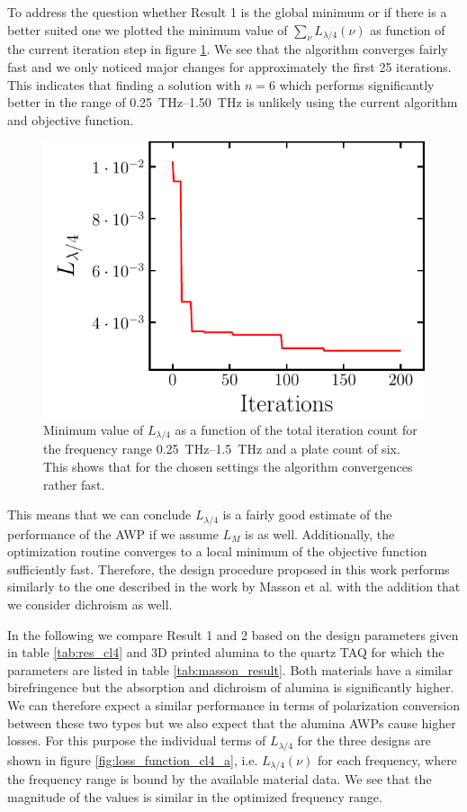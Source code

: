 To address the question whether Result 1 is the global minimum or if there is a better suited one we plotted the minimum value of $\sum_{\nu}L_{\lambda/4}(\nu)$ as function of the current iteration step in figure  \ref{fig:cl4_convergence}. We see that the algorithm converges fairly fast and we only noticed major changes for approximately the first 25 iterations. This indicates that finding a solution with $n=6$ which performs significantly better in the range of \SIrange{0.25}{1.50}{\tera \hertz} is unlikely using the current algorithm and objective function.

\begin{figure}[H]
    \centering
    \includegraphics[scale=0.7]{images/results/plots/ceramic/convergence.pdf}
    \caption{Minimum value of $L_{\lambda/4}$ as a function of the total iteration count for the frequency range \SIrange{0.25}{1.5}{\tera \hertz} and a plate count of six. This shows that for the chosen settings the algorithm convergences rather fast.}
    \label{fig:cl4_convergence}
\end{figure}

This means that we can conclude $L_{\lambda/4}$ is a fairly good estimate of the performance of the AWP if we assume $L_{M}$ is as well. Additionally, the optimization routine converges to a local minimum of the objective function sufficiently fast. Therefore, the design procedure proposed in this work performs similarly to the one described in the work by Masson et al. with the addition that we consider dichroism as well. 

In the following we compare Result 1 and 2 based on the design parameters given in table \ref{tab:res_cl4} and 3D printed alumina to the quartz TAQ for which the parameters are listed in table \ref{tab:masson_result}. Both materials have a similar birefringence but the absorption and dichroism of alumina is significantly higher. We can therefore expect a similar performance in terms of polarization conversion between these two types but we also expect that the alumina AWPs cause higher losses. For this purpose the individual terms of $L_{\lambda/4}$ for the three designs are shown in figure \ref{fig:loss_function_cl4_a}, i.e. $L_{\lambda/4}(\nu)$ for each frequency, where the frequency range is bound by the available material data. We see that the magnitude of the values is similar in the optimized frequency range.

